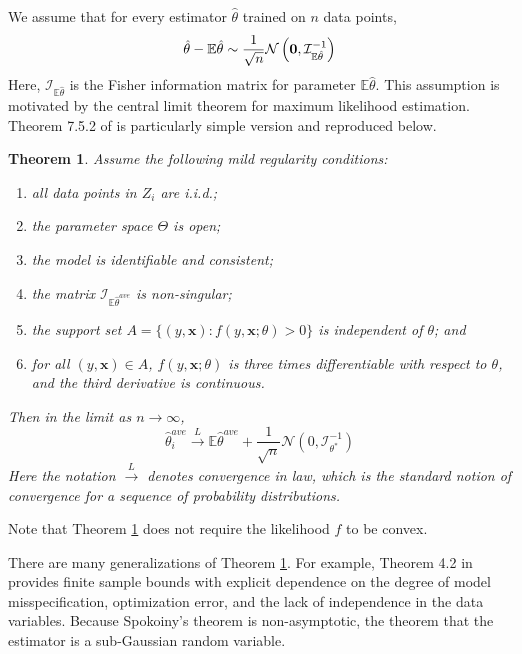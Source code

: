 \documentclass[twoside]{article}
\newtheorem{theorem}{Theorem}
\newcommand{\zero}{\text{\textbf{0}}}
\newcommand{\E}{\mathbb{E}}
\newcommand{\x}{\mathbf{x}}
\newcommand{\w}{\theta}
\newcommand{\wave}{\hat\w^{ave}}
\newcommand{\wtave}{\E\hat\w^{ave}}
\newcommand{\wmle}{\hat\w^{mle}}
\newcommand{\wstar}{{\w^{*}}}
\newcommand{\I}{\mathcal I}
\newcommand{\law}{\ensuremath{\xrightarrow{L}}}
\newcommand{\normal}[2]{\ensuremath{\mathcal{N}\left({{#1}},{{#2}}\right)}}
\begin{document}
We assume that for every estimator $\hat\w$ trained on $n$ data points,
\begin{equation}
\label{eq:assumption}
\hat\w - \E\hat\w \sim \frac{1}{\sqrt n}\normal{\zero}{\I^{-1}_{\E\hat\w}}
\end{equation}
%
Here, $\I_{\E\hat\w}$ is the Fisher information matrix for parameter $\E\hat\w$.
This assumption is motivated by the central limit theorem for maximum likelihood estimation.
Theorem 7.5.2 of \cite{lehmann1999elements} is particularly simple version and reproduced below.
\begin{theorem}
\label{thm:clt}
Assume the following mild regularity conditions:
\begin{enumerate}[noitemsep,topsep=0pt]%
\item all data points in $Z_i$ are i.i.d.;
\item the parameter space $\Theta$ is open;
\item the model is identifiable and consistent;
\item the matrix $\I_{\wtave}$ is non-singular;
\item the support set $A = \{(y,\x) : f(y,\x;\theta) > 0\}$ is independent of $\theta$;
and \item for all $(y,\x)\in A$, $f(y,\x;\theta)$ is three times differentiable with respect to $\theta$,
and the third derivative is continuous.
\end{enumerate}
Then in the limit as $n\to\infty$,
\begin{equation*}
\wave_i \law \wtave + \frac{1}{\sqrt n} \normal{0}{\I^{-1}_\wstar}
\end{equation*}
Here the notation $\law$ denotes convergence in law,
which is the standard notion of convergence for a sequence of probability distributions.
\end{theorem}

Note that Theorem \ref{thm:clt} does not require the likelihood $f$ to be convex.


There are many generalizations of Theorem \ref{thm:clt}.
For example, Theorem 4.2 in \cite{spokoiny2012parametric} provides finite sample bounds with explicit dependence on the degree of model misspecification, optimization error, and the lack of independence in the data variables.
Because Spokoiny's theorem is non-asymptotic, the theorem that the estimator is a sub-Gaussian random variable.
\end{document}
